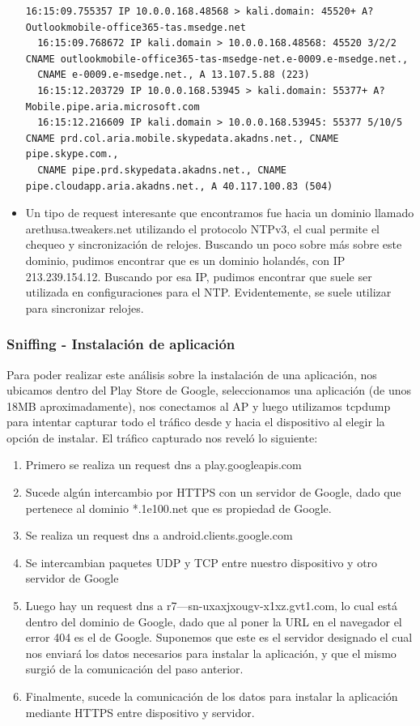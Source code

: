 \begin{itemize}
\begin{lstlisting}[style=base]
  16:15:09.755357 IP 10.0.0.168.48568 > kali.domain: 45520+ A? Outlookmobile-office365-tas.msedge.net
  16:15:09.768672 IP kali.domain > 10.0.0.168.48568: 45520 3/2/2 CNAME outlookmobile-office365-tas-msedge-net.e-0009.e-msedge.net., 
  CNAME e-0009.e-msedge.net., A 13.107.5.88 (223)
  16:15:12.203729 IP 10.0.0.168.53945 > kali.domain: 55377+ A? Mobile.pipe.aria.microsoft.com
  16:15:12.216609 IP kali.domain > 10.0.0.168.53945: 55377 5/10/5 CNAME prd.col.aria.mobile.skypedata.akadns.net., CNAME pipe.skype.com., 
  CNAME pipe.prd.skypedata.akadns.net., CNAME pipe.cloudapp.aria.akadns.net., A 40.117.100.83 (504)
\end{lstlisting}

\item Un tipo de request interesante que encontramos fue hacia un dominio llamado arethusa.tweakers.net utilizando el protocolo NTPv3, el cual 
permite el chequeo y sincronización de relojes. Buscando un poco sobre más sobre este dominio, pudimos encontrar que es un dominio holandés, 
con IP 213.239.154.12. Buscando por esa IP, pudimos encontrar que suele ser utilizada en configuraciones para el NTP. Evidentemente, se 
suele utilizar para sincronizar relojes.

\end{itemize}

\subsubsection{Sniffing - Instalación de aplicación}

Para poder realizar este análisis sobre la instalación de una aplicación, nos ubicamos dentro del Play Store de Google, seleccionamos una 
aplicación (de unos 18MB aproximadamente), nos conectamos al AP y luego utilizamos tcpdump para intentar capturar todo el tráfico desde 
y hacia el dispositivo al elegir la opción de instalar. El tráfico capturado nos reveló lo siguiente:

\begin{enumerate}
  \item Primero se realiza un request dns a play.googleapis.com
  \item Sucede algún intercambio por HTTPS con un servidor de Google, dado que pertenece al dominio *.1e100.net que es propiedad de Google.
  \item Se realiza un request dns a android.clients.google.com
  \item Se intercambian paquetes UDP y TCP entre nuestro dispositivo y otro servidor de Google
  \item Luego hay un request dns a r7---sn-uxaxjxougv-x1xz.gvt1.com, lo cual está dentro del dominio de Google, dado que al poner la URL 
  en el navegador el error 404 es el de Google. Suponemos que este es el servidor designado el cual nos enviará los datos necesarios para 
  instalar la aplicación, y que el mismo surgió de la comunicación del paso anterior.
  \item Finalmente, sucede la comunicación de los datos para instalar la aplicación mediante HTTPS entre dispositivo y servidor. 
\end{enumerate}


